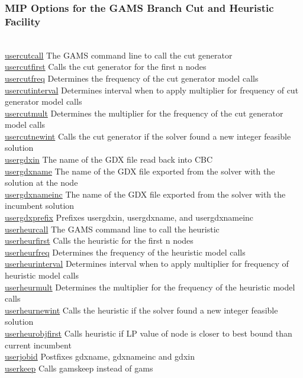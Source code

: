 \subsubsection{MIP Options for the GAMS Branch Cut and Heuristic Facility}

\begin{tabbing}
\hspace {1.3in} \= \\
\hyperlink{usercutcall}
{usercutcall} \> The GAMS command line to call the cut generator \\
\hyperlink{usercutfirst}
{usercutfirst} \> Calls the cut generator for the first n nodes \\
\hyperlink{usercutfreq}
{usercutfreq} \> Determines the frequency of the cut generator model calls \\
\hyperlink{usercutinterval}
{usercutinterval} \> Determines interval when to apply multiplier for frequency of cut generator model calls \\
\hyperlink{usercutmult}
{usercutmult} \> Determines the multiplier for the frequency of the cut generator model calls \\
\hyperlink{usercutnewint}
{usercutnewint} \> Calls the cut generator if the solver found a new integer feasible solution \\
\hyperlink{usergdxin}
{usergdxin} \> The name of the GDX file read back into CBC \\
\hyperlink{usergdxname}
{usergdxname} \> The name of the GDX file exported from the solver with the solution at the node \\
\hyperlink{usergdxnameinc}
{usergdxnameinc} \> The name of the GDX file exported from the solver with the incumbent solution \\
\hyperlink{usergdxprefix}
{usergdxprefix} \> Prefixes usergdxin, usergdxname, and usergdxnameinc \\
\hyperlink{userheurcall}
{userheurcall} \> The GAMS command line to call the heuristic \\
\hyperlink{userheurfirst}
{userheurfirst} \> Calls the heuristic for the first n nodes \\
\hyperlink{userheurfreq}
{userheurfreq} \> Determines the frequency of the heuristic model calls \\
\hyperlink{userheurinterval}
{userheurinterval} \> Determines interval when to apply multiplier for frequency of heuristic model calls \\
\hyperlink{userheurmult}
{userheurmult} \> Determines the multiplier for the frequency of the heuristic model calls \\
\hyperlink{userheurnewint}
{userheurnewint} \> Calls the heuristic if the solver found a new integer feasible solution \\
\hyperlink{userheurobjfirst}
{userheurobjfirst} \> Calls heuristic if LP value of node is closer to best bound than current incumbent \\
\hyperlink{userjobid}
{userjobid} \> Postfixes gdxname, gdxnameinc and gdxin \\
\hyperlink{userkeep}
{userkeep} \> Calls gamskeep instead of gams \\
\end{tabbing}
